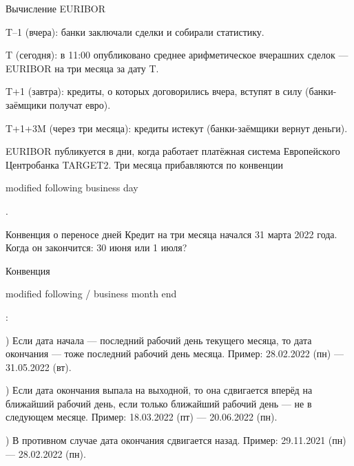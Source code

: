 \documentclass{beamer}
\newcommand{\en}[1]{\begin{otherlanguage}{english}#1\end{otherlanguage}}
\begin{document}
\begin{frame}{Вычисление EURIBOR}
\centering
{}
	
\justify
T--1 (вчера):  банки заключали сделки и собирали статистику.

T (сегодня): в 11:00 опубликовано среднее арифметическое вчерашних сделок --- EURIBOR на три месяца за дату T.

T+1 (завтра): кредиты, о которых договорились вчера, вступят в силу (банки-заёмщики получат евро).

T+1+3M (через три месяца): кредиты истекут (банки-заёмщики вернут деньги).

\justify
EURIBOR публикуется в дни, когда работает платёжная система Европейского Центробанка TARGET2. Три месяца прибавляются по конвенции \en{modified following business day}.
\end{frame}



\begin{frame}{Конвенция о переносе дней}
\justify
Кредит на три месяца начался 31 марта 2022 года. Когда он закончится: 30 июня или 1 июля?

\justify
Конвенция \en{modified following / business month end}:

) Если дата начала --- последний рабочий день текущего месяца, то дата окончания --- тоже последний рабочий день месяца. Пример: 28.02.2022 (пн) --- 31.05.2022 (вт).

) Если дата окончания выпала на выходной, то она сдвигается вперёд на ближайший 
рабочий день, если только ближайший рабочий день --- не в следующем месяце. Пример: 
18.03.2022 (пт) --- 20.06.2022 (пн).

) В противном случае дата окончания сдвигается назад. Пример: 29.11.2021 (пн) --- 28.02.2022 (пн).
\end{frame}
\end{document}
